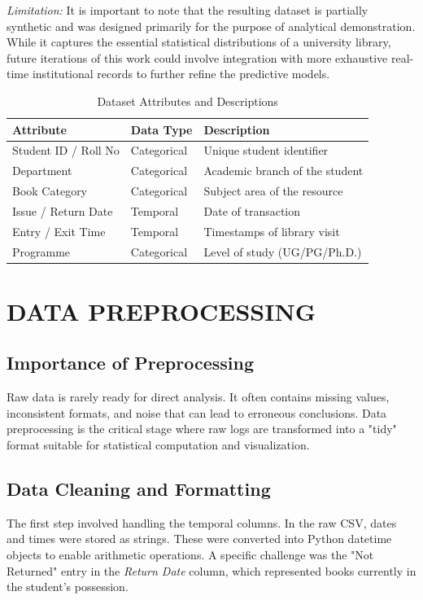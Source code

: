 \documentclass[12pt,a4paper]{report}
\begin{document}
\textit{Limitation:} It is important to note that the resulting dataset is partially synthetic and was designed primarily for the purpose of analytical demonstration. While it captures the essential statistical distributions of a university library, future iterations of this work could involve integration with more exhaustive real-time institutional records to further refine the predictive models.

\begin{table}[H]
\centering
\begin{tabular}{@{}lll@{}}
\toprule
\textbf{Attribute} & \textbf{Data Type} & \textbf{Description} \\ \midrule
Student ID / Roll No & Categorical & Unique student identifier \\
Department & Categorical & Academic branch of the student \\
Book Category & Categorical & Subject area of the resource \\
Issue / Return Date & Temporal & Date of transaction \\
Entry / Exit Time & Temporal & Timestamps of library visit \\
Programme & Categorical & Level of study (UG/PG/Ph.D.) \\ \bottomrule
\end{tabular}
\caption{Dataset Attributes and Descriptions}
\end{table}

\chapter{DATA PREPROCESSING}
\section{Importance of Preprocessing}
Raw data is rarely ready for direct analysis. It often contains missing values, inconsistent formats, and noise that can lead to erroneous conclusions. Data preprocessing is the critical stage where raw logs are transformed into a "tidy" format suitable for statistical computation and visualization.

\section{Data Cleaning and Formatting}
The first step involved handling the temporal columns. In the raw CSV, dates and times were stored as strings. These were converted into Python datetime objects to enable arithmetic operations. A specific challenge was the "Not Returned" entry in the \textit{Return Date} column, which represented books currently in the student's possession.
\end{document}
